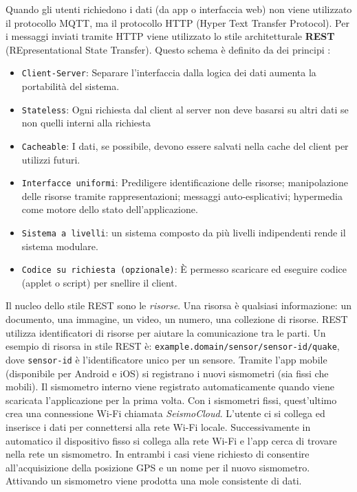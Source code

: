\documentclass[a4paper,10pt]{memoir}
\begin{document}
Quando gli utenti richiedono i dati (da app o interfaccia web) non viene utilizzato il protocollo MQTT, ma il protocollo HTTP (Hyper Text Transfer Protocol).
Per i messaggi inviati tramite HTTP viene utilizzato lo stile architetturale \textbf{REST} (REpresentational State Transfer).
Questo schema è definito da dei principi \cite{rest}:
\begin{itemize}
  \item \texttt{Client-Server}: Separare l'interfaccia dalla logica dei dati aumenta la portabilità del sistema.
  \item \texttt{Stateless}: Ogni richiesta dal client al server non deve basarsi su altri dati se non quelli interni alla richiesta
  \item \texttt{Cacheable}: I dati, se possibile, devono essere salvati nella cache del client per utilizzi futuri.
  \item \texttt{Interfacce uniformi}: Prediligere identificazione delle risorse; manipolazione delle risorse tramite rappresentazioni; messaggi auto-esplicativi; hypermedia come motore dello stato dell'applicazione.
  \item \texttt{Sistema a livelli}: un sistema composto da più livelli indipendenti rende il sistema modulare.
  \item \texttt{Codice su richiesta (opzionale)}: È permesso scaricare ed eseguire codice (applet o script) per snellire il client.
\end{itemize}
Il nucleo dello stile REST sono le \textit{risorse}.
Una risorsa è qualsiasi informazione: un documento, una immagine, un video, un numero, una collezione di risorse.
REST utilizza identificatori di risorse per aiutare la comunicazione tra le parti.
Un esempio di risorsa in stile REST è: \texttt{example.domain/sensor/sensor-id/quake}, dove \texttt{sensor-id} è l'identificatore unico per un sensore.
Tramite l'app mobile (disponibile per Android e iOS) si registrano i nuovi sismometri (sia fissi che mobili). Il sismometro interno viene registrato automaticamente quando viene scaricata l'applicazione per la prima volta. Con i sismometri fissi, quest'ultimo crea una connessione Wi-Fi chiamata \textit{SeismoCloud}. L'utente ci si collega ed inserisce i dati per connettersi alla rete Wi-Fi locale. Successivamente in automatico il dispositivo fisso si collega alla rete Wi-Fi e l'app cerca di trovare nella rete un sismometro.
In entrambi i casi viene richiesto di consentire all'acquisizione della posizione GPS e un nome per il nuovo sismometro.
Attivando un sismometro viene prodotta una mole consistente di dati.
\end{document}
